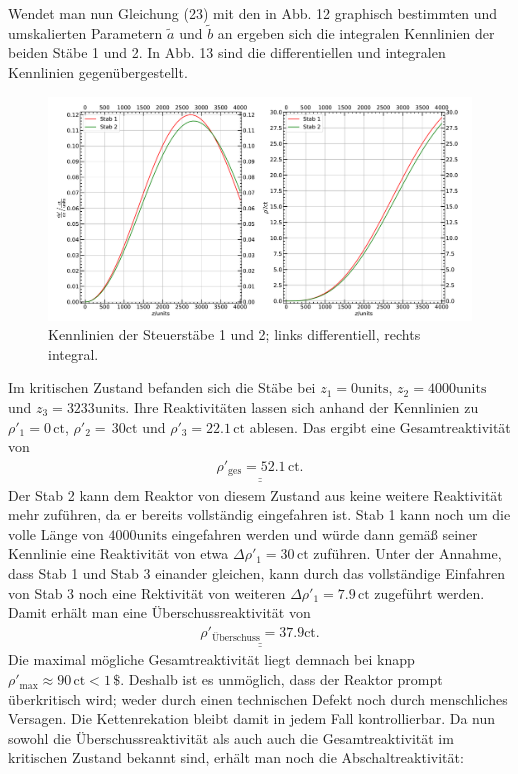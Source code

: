 \documentclass[german,  %
parskip=full,  %
]{scrartcl}
\begin{document}
Wendet man nun Gleichung (23) mit den in Abb. 12 graphisch bestimmten und umskalierten Parametern \(\tilde{a}\) und \(\tilde{b}\) an ergeben sich die integralen Kennlinien der beiden Stäbe 1 und 2. In Abb. 13 sind die differentiellen und integralen Kennlinien gegenübergestellt.
\newpage
\begin{figure}[h!]\centering
\includegraphics[width=\textwidth]{Kennlinien.pdf}
\caption{Kennlinien der Steuerstäbe 1 und 2; links differentiell, rechts integral.}
\end{figure}
Im kritischen Zustand befanden sich die Stäbe bei \(z_1=0\mathrm{units}\), \(z_2=4000\mathrm{units}\) und \(z_3=3233\mathrm{units}\). Ihre Reaktivitäten lassen sich anhand der Kennlinien zu \(\rho'_1 = 0\,\mathrm{ct}\), \(\rho'_2 = \,30\mathrm{ct}\) und \(\rho'_3 = 22.1\,\mathrm{ct}\) ablesen. Das ergibt eine Gesamtreaktivität von 
\begin{align*}
\underline{\underline{\rho'_{\mathrm{ges}} = 52.1\,\mathrm{ct}.}}
\end{align*}
Der Stab 2 kann dem Reaktor von diesem Zustand aus keine weitere Reaktivität mehr zuführen, da er bereits vollständig eingefahren ist. Stab 1 kann noch um die volle Länge von \(4000\mathrm{units}\) eingefahren werden und würde dann gemäß seiner Kennlinie eine Reaktivität von etwa \(\Delta\rho'_1=30\,\mathrm{ct}\) zuführen. Unter der Annahme, dass Stab 1 und Stab 3 einander gleichen, kann durch das vollständige Einfahren von Stab 3 noch eine Rektivität von weiteren \(\Delta\rho'_1=7.9\,\mathrm{ct}\) zugeführt werden. Damit erhält man eine Überschussreaktivität von
\begin{align*}
\underline{\underline{\rho'_{\mathrm{Überschuss}} = 37.9\mathrm{ct}.}}
\end{align*}
Die maximal mögliche Gesamtreaktivität liegt demnach bei knapp \(\rho'_{\mathrm{max}}\approx 90\,\mathrm{ct} < 1\,\$\). Deshalb ist es unmöglich, dass der Reaktor prompt überkritisch wird; weder durch einen technischen Defekt noch durch menschliches Versagen. Die Kettenrekation bleibt damit in jedem Fall kontrollierbar. Da nun sowohl die Überschussreaktivität als auch auch die Gesamtreaktivität im kritischen Zustand bekannt sind, erhält man noch die Abschaltreaktivität:
\end{document}
